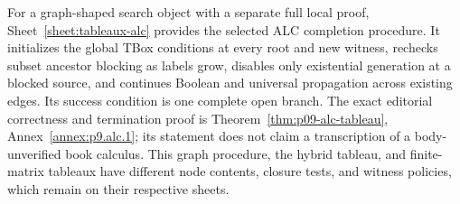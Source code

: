 For a graph-shaped search object with a separate full local proof,
Sheet~\ref{sheet:tableaux-alc} provides the selected ALC completion
procedure.  It initializes the global TBox conditions at every root and
new witness, rechecks subset ancestor blocking as labels grow, disables
only existential generation at a blocked source, and continues Boolean
and universal propagation across existing edges.  Its success condition is
one complete open branch.  The exact editorial correctness and termination
proof is Theorem~\ref{thm:p09-alc-tableau},
Annex~\ref{annex:p9.alc.1}; its statement does not claim a transcription of
a body-unverified book calculus.  This graph procedure, the hybrid tableau,
and finite-matrix tableaux have different node contents, closure tests,
and witness policies, which remain on their respective sheets.


